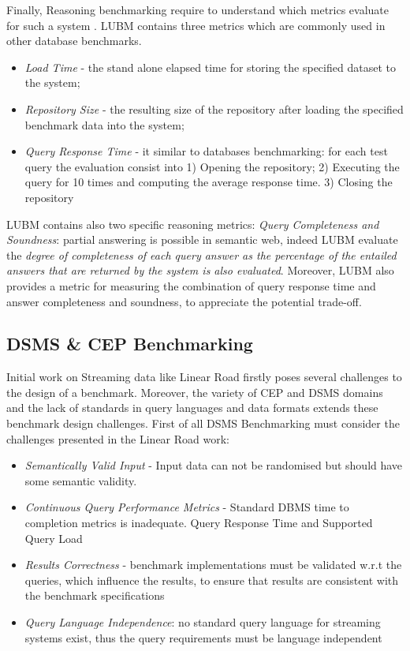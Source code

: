 Finally, Reasoning benchmarking require to understand which metrics evaluate for such a system \cite{Guo2005}. LUBM contains three metrics which are commonly used in other database benchmarks.\begin{itemize}
\item \textit{Load Time} - the stand alone elapsed time for storing the specified dataset to the system;
\item \textit{Repository Size} -  the resulting size of the repository after loading the specified benchmark data into the system;
\item \textit{Query Response Time} - it similar to databases benchmarking: for each test query the evaluation consist into
  	1) Opening the repository; 2) Executing the query for 10 times and computing the average response time. 3) Closing the repository
\end{itemize}

LUBM contains also two specific reasoning metrics: \textit{Query Completeness and Soundness}: partial answering is possible in semantic web, indeed LUBM evaluate the \textit{degree of completeness of each query answer as the percentage of the entailed answers that are returned by the system is also evaluated}. Moreover, LUBM also provides a metric for measuring the combination of  query response time and answer completeness and soundness, to  appreciate the potential trade-off.

\subsection{DSMS \& CEP Benchmarking}\label{sec:linear-road}

Initial work on Streaming data like Linear Road \cite{arasu2004linear} firstly poses  several challenges to the design of a benchmark.  Moreover, the variety of CEP and DSMS domains and the lack of standards in query languages and data formats extends these benchmark design challenges. First of all DSMS Benchmarking must consider the challenges presented in the Linear Road work:
\begin{itemize}
\item  \textit{Semantically Valid Input} -  Input data can not be randomised but should have some semantic validity.
\item  \textit{Continuous Query Performance Metrics} - Standard DBMS time to completion metrics is inadequate. Query Response Time and Supported Query Load 
\item  \textit{Results Correctness} - benchmark implementations must be validated w.r.t the queries, which influence the results, to ensure that results are consistent with the benchmark specifications 
\item  \textit{Query Language Independence}: no standard query language for streaming systems exist, thus the query requirements must be language independent
\end{itemize}

